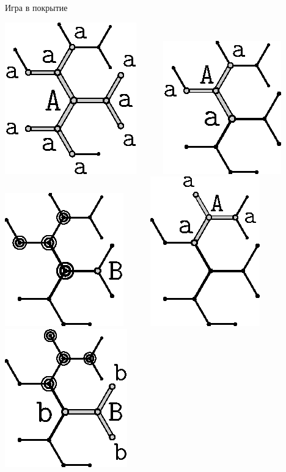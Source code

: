 \begin{problem}{Игра в покрытие}
\begin{center}
\includegraphics{covering-game.6.eps}
~~~~~
\includegraphics{covering-game.7.eps}
~~~~~
\includegraphics{covering-game.8.eps}
~~~~~
\includegraphics{covering-game.9.eps}
~~~~~
\includegraphics{covering-game.10.eps}


\end{center}
\end{problem}
